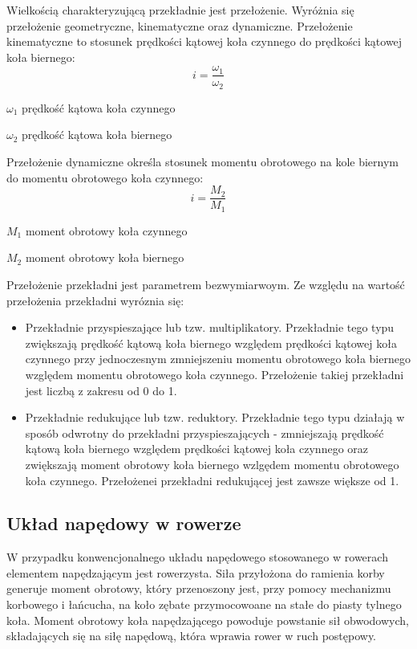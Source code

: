 Wielkością charakteryzującą przekładnie jest przełożenie. Wyróżnia się przełożenie geometryczne, kinematyczne oraz dynamiczne. Przełożenie kinematyczne to stosunek prędkości kątowej koła czynnego do prędkości kątowej koła biernego\cite{przekladnie}:
\begin{equation}
    i = \frac{\omega_1}{\omega_2}
    \label{eq:przelozenieKinematyczne}
\end{equation}
\begin{eqwhere}[2cm]
	\item[$\omega_1$] prędkość kątowa koła czynnego
	\item[$\omega_2$] prędkość kątowa koła biernego
\end{eqwhere}

Przełożenie dynamiczne określa stosunek momentu obrotowego na kole biernym do momentu obrotowego koła czynnego:
\begin{equation}
    i = \frac{M_2}{M_1}
    \label{eq:przelozenieDynamiczne}
\end{equation}
\begin{eqwhere}[2cm]
	\item[$M_1$] moment obrotowy koła czynnego
	\item[$M_2$] moment obrotowy koła biernego
\end{eqwhere}

Przełożenie przekładni jest parametrem bezwymiarwoym. Ze względu na wartość przełożenia przekładni wyróznia się:
\begin{itemize}
\item
Przekładnie przyspieszające lub tzw. multiplikatory. Przekładnie tego typu zwiększają prędkość kątową koła biernego względem prędkości kątowej koła czynnego przy jednoczesnym zmniejszeniu momentu obrotowego koła biernego względem momentu obrotowego koła czynnego. Przełożenie takiej przekładni jest liczbą z zakresu od 0 do 1.
\item
Przekładnie redukujące lub tzw. reduktory. Przekładnie tego typu działają w sposób odwrotny do przekładni przyspieszających - zmniejszają prędkość kątową koła biernego względem prędkości kątowej koła czynnego oraz zwiększają moment obrotowy koła biernego wzlgędem momentu obrotowego koła czynnego. Przełożenei przekładni redukującej jest zawsze większe od 1.
\end{itemize} 
\subsection{Układ napędowy w rowerze}
W przypadku konwencjonalnego układu napędowego stosowanego w rowerach elementem napędzającym jest rowerzysta. Siła przyłożona do ramienia korby generuje moment obrotowy, który przenoszony jest, przy pomocy mechanizmu korbowego i łańcucha, na koło zębate przymocowoane na stałe do piasty tylnego koła. Moment obrotowy koła napędzającego powoduje powstanie sił obwodowych, składających się na siłę napędową, która wprawia rower w ruch postępowy.

